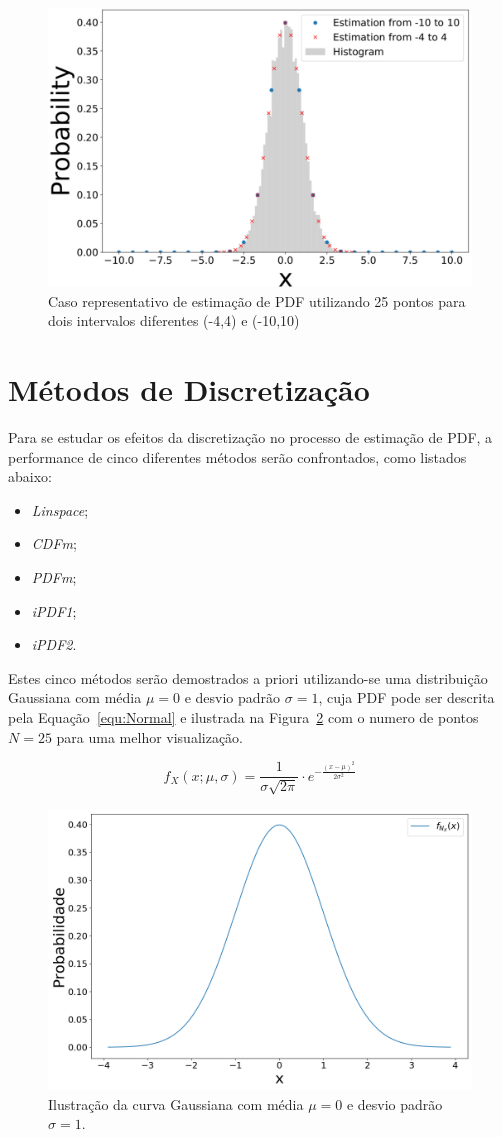 \begin{figure}[H]
	\centering
	\includegraphics[width=0.6\linewidth]{figuras/linspace2}
	\caption{Caso representativo de estimação de PDF utilizando 25 pontos para dois intervalos diferentes (-4,4) e (-10,10)}
	\label{fig:figura1}
\end{figure}


\section{Métodos de Discretização} \label{cap:anal}
Para se estudar os efeitos da discretização no processo de estimação de \ac{PDF}, a performance de cinco diferentes métodos serão confrontados, como listados abaixo: 
\begin{itemize}
	\item \textit{Linspace};
	\item \textit{CDFm};
	\item \textit{PDFm};
	\item \textit{iPDF1};
	\item \textit{iPDF2}.
\end{itemize}

Estes cinco métodos serão demostrados a priori  utilizando-se uma distribuição Gaussiana com média $\mu = 0$ e desvio padrão $\sigma = 1$, cuja \ac{PDF} pode ser descrita pela Equação~\eqref{equ:Normal} e ilustrada na Figura~\ref{fig:Gaussiana} com o numero de pontos $N = 25$ para uma melhor visualização.

\begin{equation}
{\displaystyle f_{X}(x;\mu,\sigma) = \frac{1}{\sigma\sqrt{2\pi}}\cdot e^{-\frac{(x-\mu)^2}{2\sigma^2}}}
\label{equ:Normal}
\end{equation}


\begin{figure}[H]
	\centering
	\includegraphics[width=0.6\linewidth]{./figuras/Normal}
	\caption{Ilustração da curva Gaussiana com média $\mu = 0$ e desvio padrão $\sigma = 1$.}
	\label{fig:Gaussiana}
\end{figure}


